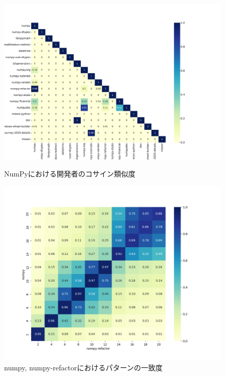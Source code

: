 \documentclass[T,J]{fose} %
\begin{document}
\begin{figure}[t]
    \centering
    \begin{minipage}{1.0\columnwidth}
        \centering
        \includegraphics[width=\columnwidth]{Noguchi_fig/dev_cosine_sim_matrix_heatmap.pdf}
        \caption{NumPyにおける開発者のコサイン類似度}
        \label{fig:dev_similarity}
    \end{minipage}
    \begin{minipage}{1.0\columnwidth}
        \centering
        \includegraphics[width=\columnwidth]{Noguchi_fig/num_numref.pdf}
        \caption{numpy, numpy-refactorにおけるパターンの一致度}
        \label{fig:num_numref_match}
    \end{minipage}
\end{figure}
\end{document}
